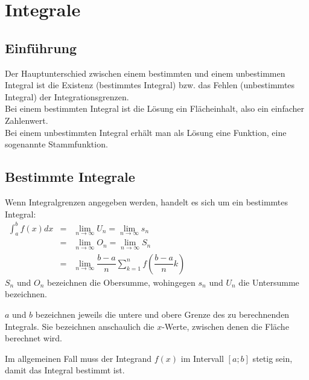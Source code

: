 \chapter{Integrale}
\section{Einführung}
Der Hauptunterschied zwischen einem bestimmten und einem unbestimmen Integral ist die Existenz (bestimmtes Integral) bzw. das Fehlen
(unbestimmtes Integral) der Integrationsgrenzen.\\
Bei einem bestimmten Integral ist die Lösung ein Flächeinhalt, also ein einfacher Zahlenwert.\\
Bei einem unbestimmten Integral erhält man als Lösung eine Funktion, eine sogenannte Stammfunktion.\\


\section{Bestimmte Integrale}
\begin{Definition}
  Wenn Integralgrenzen angegeben werden, handelt es sich um ein bestimmtes Integral:\\
  $
  \begin{array}{rcl}
    \int_{a}^{b} f(x)dx & = & \lim\limits_{n \rightarrow \infty} U_n = \lim\limits_{n \rightarrow \infty} s_n\\
                         & = & \lim\limits_{n \rightarrow \infty} O_n = \lim\limits_{n \rightarrow \infty} S_n\\
                         & = & \lim\limits_{n \rightarrow \infty} \dfrac{b-a}{n}\sum\limits_{k=1}^{n}f(\dfrac{b-a}{n}k)
  \end{array}
  $\\
  $S_n$ und $O_n$ bezeichnen die Obersumme, wohingegen $s_n$ und $U_n$ die Untersumme bezeichnen.
\end{Definition}
\begin{Bemerkung}
  $a$ und $b$ bezeichnen jeweils die untere und obere Grenze des zu berechnenden Integrals. Sie bezeichnen anschaulich die $x$-Werte, zwischen denen die Fläche berechnet wird.
\end{Bemerkung}
\begin{Bemerkung}
  Im allgemeinen Fall muss der Integrand $f(x)$ im Intervall $[a;b]$ stetig sein, damit das Integral bestimmt ist.
\end{Bemerkung}

